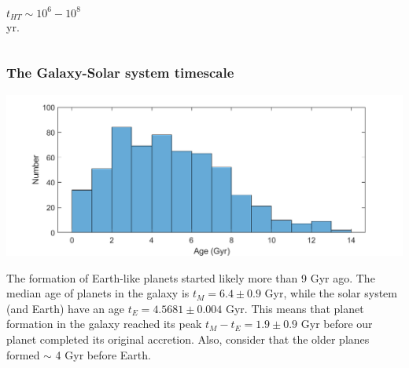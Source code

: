 \begin{frame}
\begin{columns}
\begin{block}{}

$$ t_{HT}  \sim 10^6-10^8$$ yr.

\end{block}
\end{columns}
\end{frame}

\begin{frame}
\frametitle{The Galaxy-Solar system timescale}

\includegraphics[scale=0.45]{M00s9.png}


The formation of Earth-like planets started likely more than 9 Gyr ago. The median age of planets in the galaxy is $t_M =6.4 \pm 0.9$ Gyr, while the solar system (and Earth) have an age $t_E =4.5681 \pm 0.004$ Gyr. This means that planet formation in the galaxy reached its peak  $t_M - t_E = 1.9 \pm 0.9$ Gyr before our planet completed its original accretion. Also, consider that the older planes formed $\sim$ 4 Gyr before Earth.  

\end{frame}

